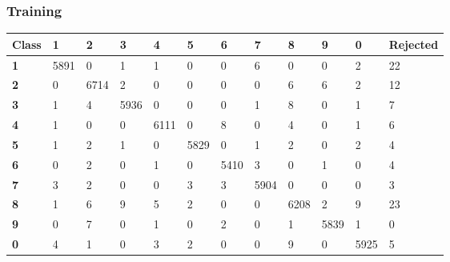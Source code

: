 \documentclass[
  a4paper,            %
  DIV=10,             %
  oneside,            %
  BCOR=5mm,           %
  parskip=half,       %
  numbers=noenddot,   %
  bibtotoc,           %
  listof=totoc,        %
  article
]{scrreprt}
\begin{document}
\subsubsection{Training}
\begin{center}
  \begin{tabular}{|p{1cm}|p{1cm}|p{1cm}|p{1cm}|p{1cm}|p{1cm}|p{1cm}|p{1cm}|p{1cm}|p{1cm}|p{1cm}|p{1.7cm}|}
    \hline
    \textbf{Class} & \textbf{1} & \textbf{2} & \textbf{3} & \textbf{4} & \textbf{5} & \textbf{6} & \textbf{7} & \textbf{8} & \textbf{9} & \textbf{0} & \textbf{Rejected} \\
    \hline
    \textbf{1} & 5891 & 0 & 1 & 1 & 0 & 0 & 6 & 0 & 0 & 2 & 22 \\
    \hline
    \textbf{2} & 0 & 6714 & 2 & 0 & 0 & 0 & 0 & 6 & 6 & 2 & 12 \\
    \hline
    \textbf{3} & 1 & 4 & 5936 & 0 & 0 & 0 & 1 & 8 & 0 & 1 & 7 \\
    \hline
    \textbf{4} & 1 & 0 & 0 & 6111 & 0 & 8 & 0 & 4 & 0 & 1 & 6 \\
    \hline
    \textbf{5} & 1 & 2 & 1 & 0 & 5829 & 0 & 1 & 2 & 0 & 2 & 4 \\
    \hline
    \textbf{6} & 0 & 2 & 0 & 1 & 0 & 5410 & 3 & 0 & 1 & 0 & 4 \\
    \hline
    \textbf{7} & 3 & 2 & 0 & 0 & 3 & 3 & 5904 & 0 & 0 & 0 & 3 \\
    \hline
    \textbf{8} & 1 & 6 & 9 & 5 & 2 & 0 & 0 & 6208 & 2 & 9 & 23 \\
    \hline
    \textbf{9} & 0 & 7 & 0 & 1 & 0 & 2 & 0 & 1 & 5839 & 1 & 0 \\
    \hline
    \textbf{0} & 4 & 1 & 0 & 3 & 2 & 0 & 0 & 9 & 0 & 5925 & 5 \\
    \hline
  \end{tabular}
\end{center}
\end{document}
